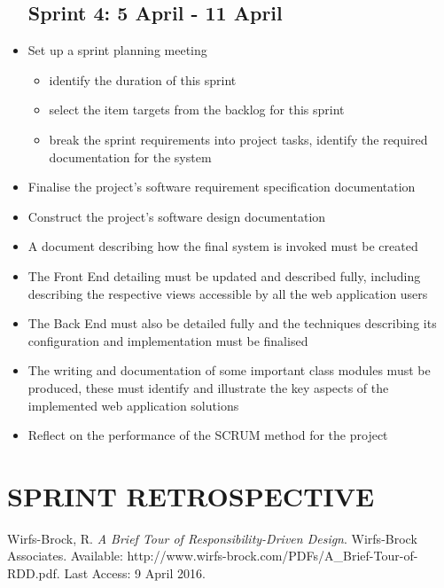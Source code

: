 \documentclass[10pt,twocolumn]{witseiepaper}
\begin{document}
\begin{itemize}
		\subsection{Sprint 4: 5 April - 11 April}
		\item Set up a sprint planning meeting
		\begin{itemize}
			\item identify the duration of this sprint
			\item select the item targets from the backlog for this sprint
			\item break the sprint requirements into project tasks, identify the required documentation for the system
		\end{itemize}
		\item Finalise the project's software requirement specification documentation
		\item Construct the project's software design documentation
		\item A document describing how the final system is invoked must be created
		\item The Front End detailing must be updated and described fully, including describing the respective views accessible by all the web application users
		\item The Back End must also be detailed fully and the techniques describing its configuration and implementation must be finalised
		\item The writing and documentation of some important class modules must be produced, these must identify and illustrate the key aspects of the implemented web application solutions
		\item Reflect on the performance of the SCRUM method for the project
	\end{itemize}	

\section{SPRINT RETROSPECTIVE}



\newpage

\begin{thebibliography}{1}
	 Wirfs-Brock, R. \textit{A Brief Tour of Responsibility-Driven Design}. Wirfs-Brock Associates. Available: http://www.wirfs-brock.com/PDFs/A\_Brief-Tour-of-RDD.pdf. Last Access: 9 April 2016.
\end{thebibliography}	
\end{document}

